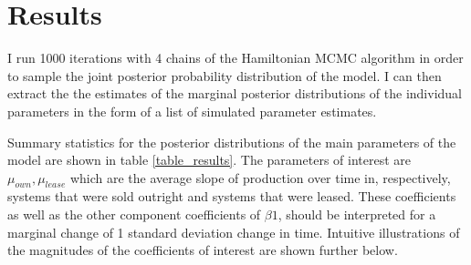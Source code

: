 \documentclass[12pt]{article}
\begin{document}
\section{Results}

I run 1000 iterations with 4 chains of the Hamiltonian MCMC algorithm in order to sample the joint posterior probability distribution of the model. I can then extract the the estimates of the marginal posterior distributions of the individual parameters in the form of a list of simulated parameter estimates.

Summary statistics for the posterior distributions of the main parameters of the model are shown in table \ref{table_results}. The parameters of interest are $\mu_{own}, \mu_{lease}$ which are the average slope of production over time in, respectively, systems that were sold outright and systems that were leased. These coefficients as well as the other component coefficients of $\beta1$, should be interpreted for a marginal change of 1 standard deviation change in time. Intuitive illustrations of the magnitudes of the coefficients of interest are shown further below.  
\end{document}
